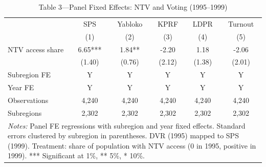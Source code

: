 \begin{table}[htbp]
\centering
\caption{Table 3---Panel Fixed Effects: NTV and Voting (1995--1999)}
\label{tab:table3}
\begin{tabular}{lccccc}
\toprule
 & SPS & Yabloko & KPRF & LDPR & Turnout \\
 & (1) & (2) & (3) & (4) & (5) \\
\midrule
NTV access share
  & 6.65*** & 1.84** & -2.20 & 1.18 & -2.06 \\
  & (1.40) & (0.76) & (2.12) & (1.38) & (2.01) \\
\addlinespace
Subregion FE & Y & Y & Y & Y & Y \\
Year FE & Y & Y & Y & Y & Y \\
\addlinespace
Observations & 4,240 & 4,240 & 4,240 & 4,240 & 4,240 \\
Subregions & 2,302 & 2,302 & 2,302 & 2,302 & 2,302 \\
\bottomrule
\multicolumn{6}{p{0.95\linewidth}}{\footnotesize
 \textit{Notes:} Panel FE regressions with subregion and year fixed effects.
 Standard errors clustered by subregion in parentheses.
 DVR (1995) mapped to SPS (1999). Treatment: share of population
 with NTV access (0 in 1995, positive in 1999).
 *** Significant at 1\%, ** 5\%, * 10\%.}
\end{tabular}
\end{table}
